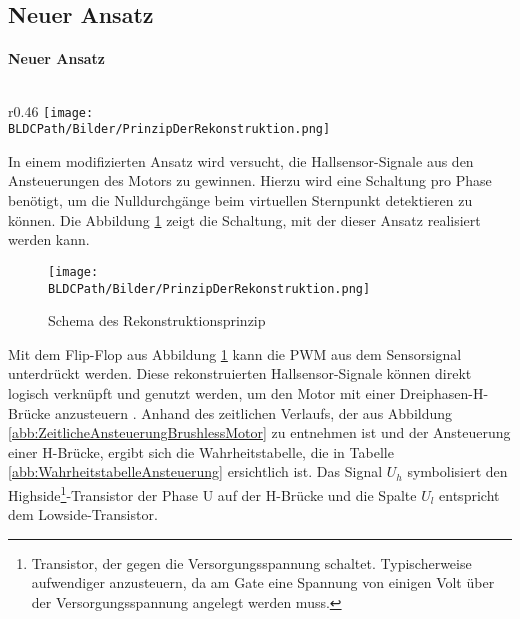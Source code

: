     \subsection{Neuer Ansatz}
\fi
\ifEMBED
    \paragraph{Neuer Ansatz}$~~$\\
\fi
    \ifEMBED
        \begin{wrapfigure}{r}{0.46\textwidth}
            \texttt{[image: \\BLDCPath/Bilder/PrinzipDerRekonstruktion.png]}
            \centering
            \caption[Schema des Rekonstruktionsprinzip]{Schema des Rekonstruktionsprinzip \cite{HSLU:Pluess}}
            \label{abb:PrinzipRekonstruktion}
        \end{wrapfigure}
    \fi
        In einem modifizierten Ansatz wird versucht, die Hallsensor-Signale 
        aus den Ansteuerungen des Motors zu gewinnen. Hierzu wird 
        eine Schaltung pro Phase benötigt, um die Nulldurchgänge beim 
        virtuellen Sternpunkt detektieren zu können. Die Abbildung 
        \ref{abb:PrinzipRekonstruktion} zeigt die Schaltung, mit der dieser Ansatz 
        realisiert werden kann. 
    \ifSTANDALONE
    	\begin{figure}[h!]
            \centering
            \texttt{[image: \\BLDCPath/Bilder/PrinzipDerRekonstruktion.png]}
           	\caption{Schema des Rekonstruktionsprinzip \protect\cite{HSLU:Pluess}}
            \label{abb:PrinzipRekonstruktion}
        \end{figure}
    \fi
        Mit dem Flip-Flop aus Abbildung \ref{abb:PrinzipRekonstruktion} kann die PWM aus dem 
        Sensorsignal unterdrückt werden. Diese rekonstruierten 
        Hallsensor-Signale können direkt logisch verknüpft und genutzt 
        werden, um den Motor mit einer Dreiphasen-H-Brücke anzusteuern 
        \cite{HSLU:Pluess}. Anhand des zeitlichen Verlaufs, der aus Abbildung 
        \ref{abb:ZeitlicheAnsteuerungBrushlessMotor} zu entnehmen ist und der 
        Ansteuerung einer H-Brücke, ergibt sich die Wahrheitstabelle, die in 
        Tabelle \ref{abb:WahrheitstabelleAnsteuerung} ersichtlich ist. Das 
        Signal $U_h$ symbolisiert den Highside\footnote{Transistor, der gegen 
        die Versorgungsspannung schaltet. Typischerweise aufwendiger 
        anzusteuern, da am Gate eine Spannung von einigen Volt über der 
        Versorgungsspannung angelegt werden muss. }-Transistor der Phase U auf der 
        H-Brücke und die Spalte $U_l$ entspricht dem Lowside-Transistor.\\      
        
